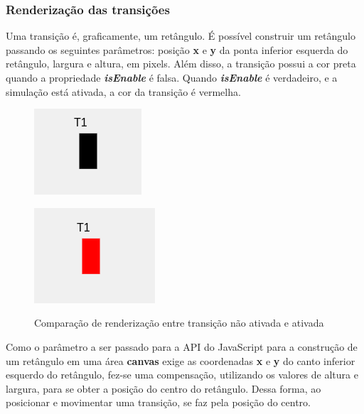 \documentclass[
	12pt,				%
	openright,			%
	oneside,			%
	a4paper,			%
	english,			%
	brazil				%
	]{abntex2}
\begin{document}
\subsubsection*{Renderização das transições}

Uma transição é, graficamente, um retângulo. É possível construir um retângulo passando os seguintes parâmetros: posição \textbf{x} e \textbf{y} da ponta inferior esquerda do retângulo, largura e altura, em pixels. Além disso, a transição possui a cor preta quando a propriedade \textbf{\textit{isEnable}} é falsa. Quando \textbf{\textit{isEnable}} é verdadeiro, e a simulação está ativada, a cor da transição é vermelha. 



\begin{figure}[ht]
	\centering
	\begin{minipage}{0.49\textwidth}
		\centering
		\includegraphics[scale=1]{figuras/renderTransitionEnableFalse.png}
		\label{fig:renderTransitionEnableFalse}
	\end{minipage}
	\hfill
	\begin{minipage}{0.49\textwidth}
		\centering
		\includegraphics[scale=1]{figuras/renderTransitionEnableTrue.png}
		\label{fig:renderTransitionEnableTrue}
	\end{minipage}
	\caption{Comparação de renderização entre transição não ativada e ativada}
\end{figure}

Como o parâmetro a ser passado para a API do JavaScript para a construção de um retângulo em uma área \textbf{canvas} exige as coordenadas \textbf{x} e \textbf{y} do canto inferior esquerdo do retângulo, fez-se uma compensação, utilizando os valores de altura e largura, para se obter a posição do centro do retângulo. Dessa forma, ao posicionar e movimentar uma transição, se faz pela posição do centro.
\end{document}
